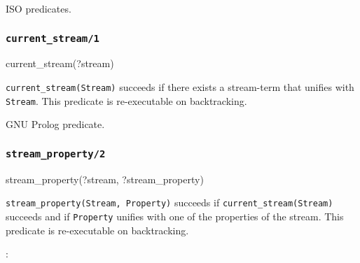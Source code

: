 \Portability

ISO predicates.

\subsubsection{\texttt{current\_stream/1}}
\label{current-stream/1}

\begin{TemplatesOneCol}
current\_stream(?stream)

\end{TemplatesOneCol}

\Description

\texttt{current\_stream(Stream)} succeeds if there exists
a stream-term that unifies with \texttt{Stream}. This predicate is
re-executable on backtracking.

\begin{PlErrors}


\end{PlErrors}

\Portability

GNU Prolog predicate.

\subsubsection{\texttt{stream\_property/2}}
\label{stream-property/2}


\begin{TemplatesOneCol}
stream\_property(?stream, ?stream\_property)

\end{TemplatesOneCol}

\Description

\texttt{stream\_property(Stream, Property)} succeeds if
\texttt{current\_stream(Stream)} succeeds  and if
\texttt{Property} unifies with one of the properties of the stream. This
predicate is re-executable on backtracking.

:

